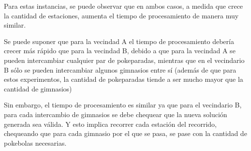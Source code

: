 \blindtext

Para estas instancias, se puede observar que en ambos casos, a medida que crece la cantidad de estaciones, aumenta el tiempo de procesamiento de manera muy similar.
\par Se puede suponer que para la vecindad A el tiempo de procesamiento debería crecer más rápido que para la vecindad B, debido a que para la vecindad A se pueden intercambiar cualquier par de pokeparadas, mientras que en el vecindario B sólo se pueden intercambiar algunos gimnasios entre sí (además de que para estos experimentos, la cantidad de pokeparadas tiende a ser mucho mayor que la cantidad de gimnasios)
\par Sin embargo, el tiempo de procesamiento es similar ya que para el vecindario B, para cada intercambio de gimnasios se debe chequear que la nueva solución generada sea válida. Y esto implica recorrer cada estación del recorrido, chequeando que para cada gimnasio por el que se pasa, se pase con la cantidad de pokebolas necesarias.